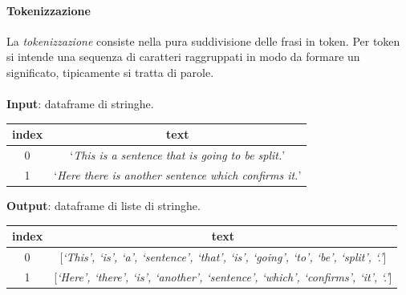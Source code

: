 \documentclass[12pt]{report}
\theoremstyle{definition}
\begin{document}
\paragraph{Tokenizzazione}
La \textit{tokenizzazione} consiste nella pura suddivisione delle frasi in token. Per token si intende una sequenza di caratteri raggruppati in modo da formare un significato, tipicamente si tratta di parole.
\\
\\
\textbf{Input}: dataframe di stringhe.
\begin{center}
    \begin{tabular}{|c|c|}
    \hline
    \textbf{index} & \textbf{text} \\
    \hline
         0 & `\textit{This is a sentence that is going to be split.}'\\
         1 & `\textit{Here there is another sentence which confirms it.}'\\
    \hline
    \end{tabular}
\end{center}
\textbf{Output}: dataframe di liste di stringhe.
\begin{center}
    \begin{tabular}{|c|c|}
    \hline
    \textbf{index} & \textbf{text} \\
    \hline
         0 & [\textit{`This', `is', `a', `sentence', `that', `is', `going', `to', `be', `split', `.'}]\\
         1 & [\textit{`Here', `there', `is', `another', `sentence', `which', `confirms', `it', `.'}]\\
    \hline
    \end{tabular}
\end{center}
\end{document}
